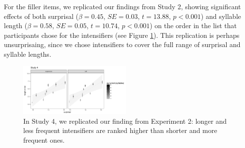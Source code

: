 \documentclass[10pt,letterpaper]{article}
\begin{document}
For the filler items, we replicated our findings from Study 2, showing significant effects of both surprisal ($\beta=0.45$, $SE=0.03$, $t=13.88$, $p<0.001$)
and syllable length ($\beta=0.58$, $SE=0.05$, $t=10.74$, $p<0.001$) on the order in the list that participants chose for the intensifiers (see Figure \ref{fig:plot_study4}).
This replication is perhaps unsurprisaing, since we chose intensifiers to cover the full range of surprisal and syllable lengths.

\begin{figure}[hbt]
\begin{center}
\includegraphics[width=0.5\textwidth]{images/plot_study4.pdf}
\end{center}
\caption{In Study 4, we replicated our finding from Experiment 2: longer and less frequent intensifiers are ranked higher than shorter and more frequent ones.}
\label{fig:plot_study4}
\end{figure}

\end{document}
